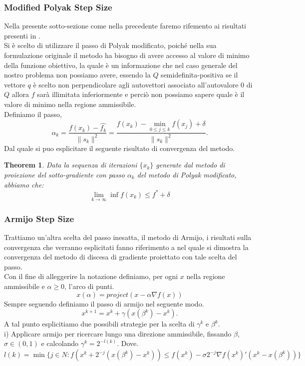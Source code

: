 \documentclass{article}
\newtheorem{theorem}{Theorem}[section]
\begin{document}
\subsubsection{Modified Polyak Step Size}
Nella presente sotto-sezione come nella precedente faremo rifemento ai risultati presenti in \cite{sgd_notes}.\\
Si è scelto di utilizzare il passo di Polyak modificato, poiché nella sua formulazione originale il metodo ha bisogno di avere accesso al valore di minimo della funzione obiettivo, la quale è un informazione che nel caso generale del nostro problema non possiamo avere, essendo la $Q$ semidefinita-positiva se il vettore $q$ è scelto non perpendicolare agli autovettori associato all'autovalore 0 di $Q$ allora $f$ sarà illimitata inferiormente e perciò non possiamo sapere quale è il valore di minimo nella regione ammissibile.\\
Definiamo il passo,
\[\alpha_k = \frac{f(x_k) - \hat{f_k}}{\|s_k\|^2} = \frac{f(x_k) - \min_{0 \leq j \leq k} f(x_j) + \delta}{\|s_k\|^2}.\]
Dal quale si puo esplicitare il seguente risultato di convergenza del metodo.
\begin{theorem}
Data la sequenza di iterazioni $\{x_k\}$ generate dal metodo di proiezione del sotto-gradiente con passo $\alpha_k$ del metodo di Polyak modificato, abbiamo che:
\[\lim_{k \to \infty} \inf f(x_k) \leq f^* + \delta\]
\end{theorem}
\subsubsection{Armijo Step Size}
Trattiamo un'altra scelta del passo inesatta, il metodo di Armijo, i risultati sulla convergenza che verranno esplicitati fanno riferimento a \cite{gafni1982convergence} nel quale si dimostra la convergenza del metodo di discesa di gradiente proiettato con tale scelta del passo.\\
Con il fine di alleggerire la notazione definiamo, per ogni $x$ nella regione ammissibile e $\alpha \geq 0$, l'arco di punti.
\[x(\alpha) = project(x - \alpha \nabla f(x))\]
Sempre seguendo \cite{gafni1982convergence} definiamo il passo di armijo nel seguente modo.
\[x^{k+1} = x^k + \gamma (x(\beta^k) - x^k).\]
A tal punto esplicitiamo due possibili strategie per la scelta di $\gamma^k$ e $\beta^k$.\\

i) Applicare armijo per ricercare lungo una direzione ammissibile, fissando $\beta$, $\sigma \in (0,1)$ e calcolando $\gamma^k = 2^{-l(k)}$. Dove.
\[l(k) = \min \{j \in N : f(x^k + 2^{-j}(x(\beta^k) - x^k)) \leq f(x^k) - \sigma 2^{-j} \nabla f(x^k)'(x^k - x(\beta^k)) \}\]
\end{document}
